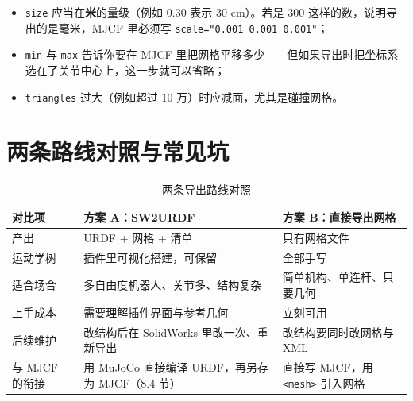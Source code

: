 \begin{itemize}
	\item \texttt{size} 应当在\textbf{米}的量级（例如 $0.30$ 表示 $30$ cm）。若是 $300$ 这样的数，说明导出的是毫米，MJCF 里必须写 \texttt{scale="0.001 0.001 0.001"}；
	\item \texttt{min} 与 \texttt{max} 告诉你要在 MJCF 里把网格平移多少——但如果导出时把坐标系选在了关节中心上，这一步就可以省略；
	\item \texttt{triangles} 过大（例如超过 $10$ 万）时应减面，尤其是碰撞网格。
\end{itemize}

\section{两条路线对照与常见坑}

\begin{table}[H]
	\centering
	\caption{两条导出路线对照}
	\label{tab:Cad:两条路线}
	\footnotesize
	\begin{tabular}{>{\raggedright\arraybackslash}p{2.4cm}>{\raggedright\arraybackslash}p{5.4cm}>{\raggedright\arraybackslash}p{5.4cm}}
		\hline
		对比项 & 方案 A：SW2URDF & 方案 B：直接导出网格 \\
		\hline
		产出 & URDF + 网格 + 清单 & 只有网格文件 \\
		运动学树 & 插件里可视化搭建，可保留 & 全部手写 \\
		适合场合 & 多自由度机器人、关节多、结构复杂 & 简单机构、单连杆、只要几何 \\
		上手成本 & 需要理解插件界面与参考几何 & 立刻可用 \\
		后续维护 & 改结构后在 SolidWorks 里改一次、重新导出 & 改结构要同时改网格与 XML \\
		与 MJCF 的衔接 & 用 MuJoCo 直接编译 URDF，再另存为 MJCF（8.4 节） & 直接写 MJCF，用 \texttt{<mesh>} 引入网格 \\
		\hline
	\end{tabular}
\end{table}

